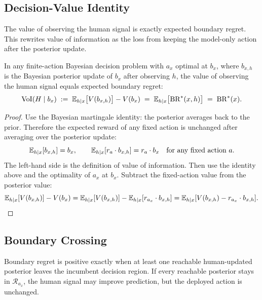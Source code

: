 \subsection{Decision-Value Identity}
The value of observing the human signal is exactly expected boundary regret.
This rewrites value of information as the loss from keeping the model-only action after the posterior update.

\begin{theorem}\label{thm:voi-br}
In any finite-action Bayesian decision problem with $a_x$ optimal at $b_x$, where $b_{x,h}$ is the Bayesian posterior update of $b_x$ after observing $h$, the value of observing the human signal equals expected boundary regret:
\begin{equation}
    \operatorname{VoI}(H \mid b_x)
    \;:=\; \mathbb{E}_{h \mid x}\bigl[V(b_{x,h})\bigr] - V(b_x)
    \;=\; \mathbb{E}_{h \mid x}\bigl[\operatorname{BR}^{*}(x, h)\bigr]
    \;=\; \operatorname{BR}^{*}(x).
\label{eq:voi-br}
\end{equation}
\end{theorem}
\vspace{-1.25em}
\begin{proof}
Use the Bayesian martingale identity: the posterior averages back to the prior.
Therefore the expected reward of any fixed action is unchanged after averaging over the posterior update:
\[
    \mathbb{E}_{h \mid x}[b_{x,h}] = b_x,
    \qquad
    \mathbb{E}_{h \mid x}[r_a \cdot b_{x,h}] = r_a \cdot b_x
    \quad\text{for any fixed action } a.
\]
The left-hand side is the definition of value of information.
Then use the identity above and the optimality of $a_x$ at $b_x$.
Subtract the fixed-action value from the posterior value:
\[
    \mathbb{E}_{h \mid x}[V(b_{x,h})] - V(b_x)
    =
    \mathbb{E}_{h \mid x}[V(b_{x,h})] - \mathbb{E}_{h \mid x}[r_{a_x} \cdot b_{x,h}]
    =
    \mathbb{E}_{h \mid x}[V(b_{x,h}) - r_{a_x} \cdot b_{x,h}].
    \qedhere
\]
\end{proof}

\subsection{Boundary Crossing}
Boundary regret is positive exactly when at least one reachable human-updated posterior leaves the incumbent decision region.
If every reachable posterior stays in $\mathcal{R}_{a_x}$, the human signal may improve prediction, but the deployed action is unchanged.

